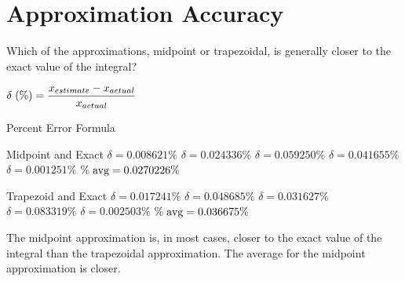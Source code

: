\documentclass[letterpaper,12pt]{article}
\begin{document}
\section{Approximation Accuracy}

\begin{large}

 Which of the approximations, midpoint or trapezoidal, is generally closer to the exact value of the integral?

\end{large}

\vspace{1cm}

\Large\centerline{$\delta\hspace{0.1cm}(\%)=\dfrac{x_{estimate}-x_{actual}}{x_{actual}}$}
\normalsize

\vspace{0.7cm}
\centerline{Percent Error Formula}

\vspace{1cm}

\begin{minipage}{0.45\textwidth}
 \begin{center}
  Midpoint and Exact
  \vskip 16pt
  $\delta=0.008621\%$
  \vskip 16pt
  $\delta=0.024336\%$
  \vskip 16pt
  $\delta=0.059250\%$
  \vskip 16pt
  $\delta=0.041655\%$
  \vskip 16pt
  $\delta=0.001251\%$
  \vskip 16pt
  $\%\hspace{0.1cm}\text{avg}=0.0270226\%$
 \end{center}
\end{minipage}
\hfill
\begin{minipage}{0.45\textwidth}
 \begin{center}
  Trapezoid and Exact
  \vskip 16pt
  $\delta=0.017241\%$
  \vskip 16pt
  $\delta=0.048685\%$
  \vskip 16pt
  $\delta=0.031627\%$
  \vskip 16pt
  $\delta=0.083319\%$
  \vskip 16pt
  $\delta=0.002503\%$
  \vskip 16pt
  $\%\hspace{0.1cm}\text{avg}=0.036675\%$
 \end{center}
\end{minipage}

\vspace{1cm}

The midpoint approximation is, in most cases, closer to the exact value of the integral than the trapezoidal approximation. The average for the midpoint approximation is closer.
\end{document}
